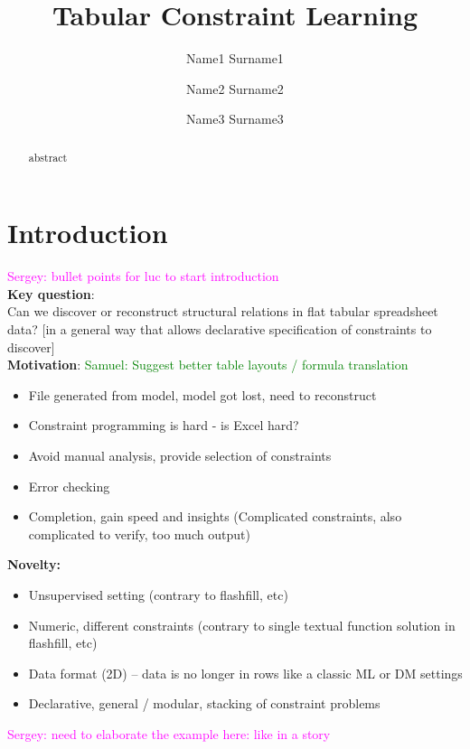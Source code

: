 \documentclass{ecai}
\newcommand{\sergey}[1]{\textcolor{magenta}{{\sc Sergey:} #1}\xspace}
\newcommand{\samuel}[1]{\textcolor{green}{{\sc Samuel:} #1}\xspace}
\begin{document}
\title{Tabular Constraint Learning}

\author{Name1 Surname1 \and Name2 Surname2 \and Name3 Surname3  }

\maketitle

\begin{abstract}
  abstract
\end{abstract}
\section{Introduction}
\sergey{bullet points for luc to start introduction}\\
\textbf{Key question}:\\
Can we discover or reconstruct structural relations in flat tabular spreadsheet data? [in a general way that allows declarative specification of constraints to discover]\\


\textbf{Motivation}:
\samuel{Suggest better table layouts / formula translation}
\begin{itemize}
  \item File generated from model, model got lost, need to reconstruct
  \item Constraint programming is hard - is Excel hard?
  \item Avoid manual analysis, provide selection of constraints
  \item Error checking
  \item Completion, gain speed and insights (Complicated constraints, also complicated to verify, too much output)
\end{itemize}

\textbf{Novelty:}
\begin{itemize}
  \item Unsupervised setting (contrary to flashfill, etc)
  \item Numeric, different constraints (contrary to single textual function solution in flashfill, etc)
  \item Data format (2D) -- data is no longer in rows like a classic ML or DM settings
  \item Declarative, general / modular, stacking of constraint problems 
\end{itemize}

\sergey{need to elaborate the example here: like in a story} 
\end{document}
